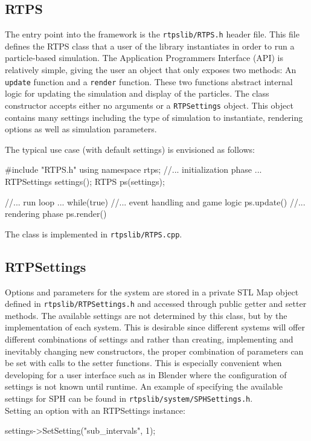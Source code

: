 \subsection{RTPS}

The entry point into the framework is the \verb|rtpslib/RTPS.h| header file. This file defines
the RTPS class that a user of the library instantiates in order to run a
particle-based simulation. The Application Programmers Interface (API) is
relatively simple, giving the user an object that only exposes two methods: An
\verb|update| function and a \verb|render| function. These two functions abstract
internal logic for updating the simulation and display of the particles. The
class constructor accepts either no arguments or a \verb|RTPSettings| object.
This object contains many settings including the type of simulation to
instantiate, rendering options as well as simulation parameters. 

The typical use case (with default settings) is envisioned as follows:
\begin{cppcode}{0}
#include "RTPS.h"
using namespace rtps;
//... initialization phase ...
RTPSettings settings();
RTPS ps(settings);

//... run loop ...
while(true)
{
    //... event handling and game logic
    ps.update()
    //... rendering phase
    ps.render()
}

\end{cppcode}

The class is implemented in \verb|rtpslib/RTPS.cpp|.

\subsection{RTPSettings}

Options and parameters for the system are stored in a private STL Map object
defined in \verb|rtpslib/RTPSettings.h| and accessed through public getter and
setter methods. The available settings are not determined by this class, but by
the implementation of each system. This is desirable since different systems
will offer different combinations of settings and rather than creating,
implementing and inevitably changing new constructors, the proper combination
of parameters can be set with calls to the setter functions. This is especially
convenient when developing for a user interface such as in Blender where the
configuration of settings is not known until runtime.  
An example of specifying the available settings for SPH can be found in
\verb|rtpslib/system/SPHSettings.h|.
\\
\noindent Setting an option with an RTPSettings instance:
\begin{cppcode}{0}
settings->SetSetting("sub_intervals", 1);
\end{cppcode}

